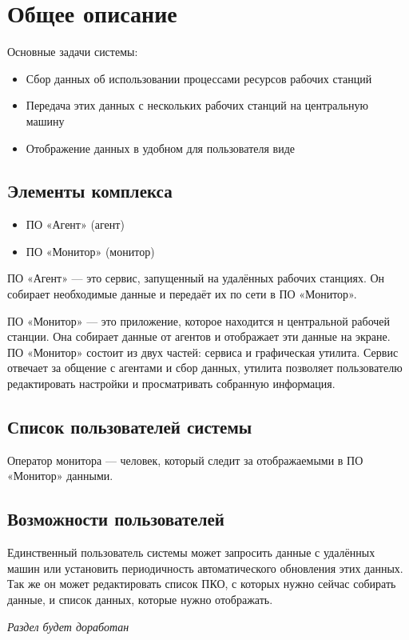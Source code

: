 \section{Общее описание}

Основные задачи системы:
\begin{itemize}
\item	Сбор данных об использовании процессами ресурсов рабочих станций
\item	Передача этих данных с нескольких рабочих станций на центральную машину
\item	Отображение данных в удобном для пользователя виде
\end{itemize}

\subsection{Элементы комплекса}
\begin{itemize}
\item	ПО «Агент» (агент)
\item	ПО «Монитор» (монитор)
\end{itemize}

ПО «Агент» —  это сервис, запущенный на удалённых рабочих станциях. Он собирает необходимые данные и передаёт их по сети в ПО «Монитор».

ПО «Монитор» — это приложение, которое находится н центральной рабочей станции. Она собирает данные от агентов и отображает эти данные на экране. ПО «Монитор» состоит из двух частей: сервиса и графическая утилита. Сервис отвечает за общение с агентами и сбор данных, утилита позволяет пользователю редактировать настройки и просматривать собранную информация.

\subsection{Список пользователей системы}
Оператор монитора — человек, который следит за отображаемыми в ПО «Монитор» данными.

\subsection{Возможности пользователей}
Единственный пользователь системы может запросить данные с удалённых машин или установить периодичность автоматического обновления этих данных. Так же он может редактировать список ПКО, с которых нужно сейчас собирать данные, и список данных, которые нужно отображать.

\textsl{Раздел будет доработан}